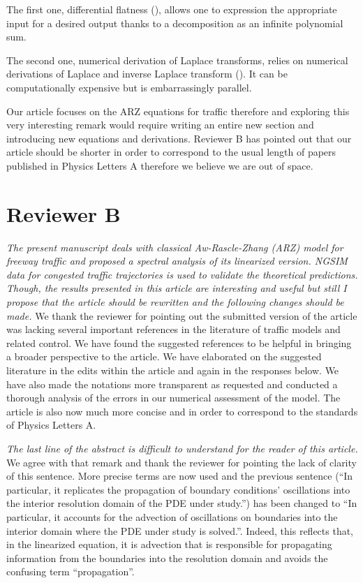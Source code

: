 \documentclass{article}
\begin{document}
The first one, differential flatness (\cite{1184520}), allows one to expression the appropriate input for a desired output thanks to a decomposition as an infinite polynomial sum.

The second one, numerical derivation of Laplace transforms, relies on numerical derivations of Laplace and inverse Laplace transform (\cite{inverse}). It can be computationally expensive but is embarrassingly parallel.

Our article focuses on the ARZ equations for traffic therefore and exploring this very interesting remark would require writing an entire new section and introducing new equations and derivations. Reviewer B has pointed out that our article should be shorter in order to correspond to the usual length of papers published in Physics Letters A therefore we believe we are out of space.


\newpage

\section{Reviewer B}
\emph{
The present manuscript deals with classical Aw-Rascle-Zhang (ARZ) model for freeway traffic and proposed a spectral analysis of its linearized version. NGSIM data for congested traffic trajectories is used to validate the theoretical predictions. Though, the results presented in this article are interesting and useful but still I propose that the article should be rewritten and the following changes should be made.
}
We thank the reviewer for pointing out the submitted version of the article was lacking several important references in the literature of traffic models and related control. We have found the suggested references to be helpful in bringing a broader perspective to the article. We have elaborated on the suggested literature in the edits within the article and again in the responses below. We have also made the notations more transparent as requested and conducted a thorough analysis of the errors in our numerical assessment of the model. The article is also now much more concise and in order to correspond to the standards of Physics Letters A.\\

\bigskip{}

\emph{
The last line of the abstract is difficult to understand for the reader of this article.
}
We agree with that remark and thank the reviewer for pointing the lack of clarity of this sentence.
More precise terms are now used and the previous sentence (``In particular, it replicates the propagation of boundary conditions’ oscillations into the interior resolution domain of the PDE under study.'') has been changed to ``In particular, it accounts for the advection of oscillations on boundaries into the interior domain where the PDE under study is solved.''. Indeed, this reflects that, in the linearized equation, it is advection that is responsible for propagating information from the boundaries into the resolution domain and avoids the confusing term ``propagation''.
\end{document}
